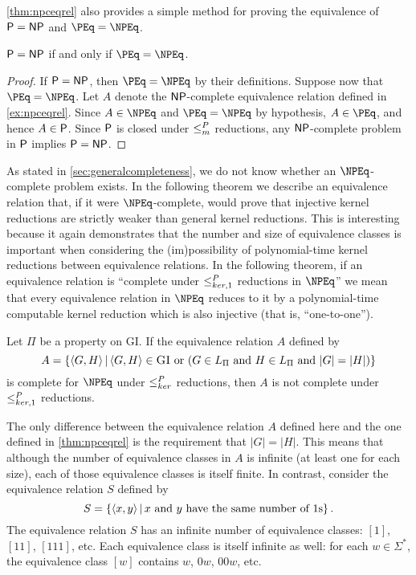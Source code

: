 \autoref{thm:npceqrel} also provides a simple method for proving the equivalence of $\P = \NP$ and $\PEq = \NPEq$.

\begin{theorem}\label{thm:pnppeqnpeq}
  $\P = \NP$ if and only if $\PEq = \NPEq$.
\end{theorem}
\begin{proof}
  If $\P = \NP$, then $\PEq = \NPEq$ by their definitions.
  Suppose now that $\PEq = \NPEq$.
  Let $A$ denote the $\NP$-complete equivalence relation defined in \autoref{ex:npceqrel}.
  Since $A \in \NPEq$ and $\PEq = \NPEq$ by hypothesis, $A \in \PEq$, and hence $A \in \P$.
  Since $\P$ is closed under $\mor$ reductions, any $\NP$-complete problem in $\P$ implies $\P = \NP$.
\end{proof}

As stated in \autoref{sec:generalcompleteness}, we do not know whether an $\NPEq$-complete problem exists.
In the following theorem we describe an equivalence relation that, if it were $\NPEq$-complete, would prove that injective kernel reductions are strictly weaker than general kernel reductions.
This is interesting because it again demonstrates that the number and size of equivalence classes is important when considering the (im)possibility of polynomial-time kernel reductions between equivalence relations.
In the following theorem, if an equivalence relation is ``complete under $\kri$ reductions in $\NPEq$'' we mean that every equivalence relation in $\NPEq$ reduces to it by a polynomial-time computable kernel reduction which is also injective (that is, ``one-to-one'').

\begin{theorem}\label{thm:inj}
  Let $\Pi$ be a property on \textsc{GI}.
  If the equivalence relation $A$ defined by
  \begin{equation*}
    A = \left\{ \pair{G}{H} \, \middle| \, \pair{G}{H} \in \textsc{GI} \text{ or } (G \in L_\Pi \text{ and } H \in L_\Pi \text{ and } |G| = |H|) \right\}
  \end{equation*}
  is complete for $\NPEq$ under $\kr$ reductions, then $A$ is not complete under $\kri$ reductions.
\end{theorem}

The only difference between the equivalence relation $A$ defined here and the one defined in \autoref{thm:npceqrel} is the requirement that $|G| = |H|$.
This means that although the number of equivalence classes in $A$ is infinite (at least one for each size), each of those equivalence classes is itself finite.
In contrast, consider the equivalence relation $S$ defined by
\begin{equation*}\label{eq:ones}
  S = \left\{ \pair{x}{y} \, \middle| \, x \text{ and } y \text{ have the same number of } 1 \text{s} \right\}.
\end{equation*}
The equivalence relation $S$ has an infinite number of equivalence classes: $[1]$, $[11]$, $[111]$, etc.
Each equivalence class is itself infinite as well: for each $w \in \Sigma^*$, the equivalence class $[w]$ contains $w$, $0w$, $00w$, etc.

